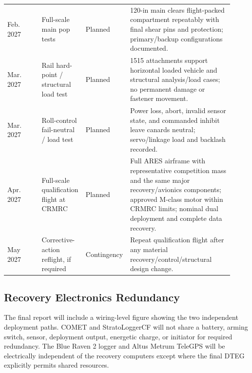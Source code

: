 \documentclass[10pt]{article}
\begin{document}
\begin{longtable}{@{}p{0.15\linewidth}p{0.18\linewidth}p{0.14\linewidth}p{0.45\linewidth}@{}}
Feb. 2027 & Full-scale main pop tests & Planned & 120-in main clears flight-packed compartment repeatably with final shear pins and protection; primary/backup configurations documented. \\
Mar. 2027 & Rail hard-point / structural load test & Planned & 1515 attachments support horizontal loaded vehicle and structural analysis/load cases; no permanent damage or fastener movement. \\
Mar. 2027 & Roll-control fail-neutral / load test & Planned & Power loss, abort, invalid sensor state, and commanded inhibit leave canards neutral; servo/linkage load and backlash recorded. \\
Apr. 2027 & Full-scale qualification flight at CRMRC & Planned & Full ARES airframe with representative competition mass and the same major recovery/avionics components; approved M-class motor within CRMRC limits; nominal dual deployment and complete data recovery. \\
May 2027 & Corrective-action reflight, if required & Contingency & Repeat qualification flight after any material recovery/control/structural design change. \\
\bottomrule
\end{longtable}

\subsection{Recovery Electronics Redundancy}
The final report will include a wiring-level figure showing the two independent deployment paths. COMET and StratoLoggerCF will not share a battery, arming switch, sensor, deployment output, energetic charge, or initiator for required redundancy. The Blue Raven 2 logger and Altus Metrum TeleGPS will be electrically independent of the recovery computers except where the final DTEG explicitly permits shared resources.

\end{document}
